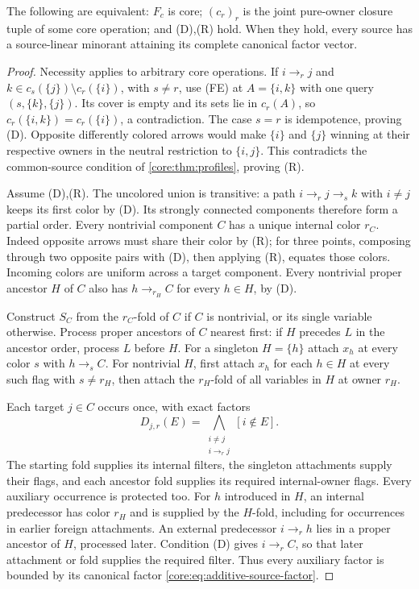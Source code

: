 \begin{theorem}
\label{core:thm:additive-closures}
The following are equivalent: $F_c$ is core; $(c_r)_r$ is the joint
pure-owner closure tuple of some core operation; and (D),(R) hold.
When they hold, every source has a source-linear minorant attaining
its complete canonical factor vector.
\end{theorem}
\begin{proof}
Necessity applies to arbitrary core operations. If $i\to_r j$ and
$k\in c_s(\{j\})\setminus c_r(\{i\})$, with $s\ne r$, use (FE)
at $A=\{i,k\}$ with one query $(s,\{k\},\{j\})$. Its cover is
empty and its sets lie in $c_r(A)$, so
$c_r(\{i,k\})=c_r(\{i\})$, a contradiction. The case $s=r$ is
idempotence, proving (D). Opposite differently colored arrows would
make $\{i\}$ and $\{j\}$ winning at their respective owners in the
neutral restriction to $\{i,j\}$. This contradicts the common-source
condition of \cref{core:thm:profiles}, proving (R).

Assume (D),(R). The uncolored union is transitive: a path
$i\to_r j\to_s k$ with $i\ne j$ keeps its first color by (D).
Its strongly connected components therefore form a partial order.
Every nontrivial component $C$ has a unique internal color $r_C$.
Indeed opposite arrows must share their color by (R); for three
points, composing through two opposite pairs with (D), then applying
(R), equates those colors. Incoming colors are uniform across a
target component. Every nontrivial proper ancestor $H$ of $C$ also
has $h\to_{r_H}C$ for every $h\in H$, by (D).

Construct $S_C$ from the $r_C$-fold of $C$ if $C$ is nontrivial,
or its single variable otherwise. Process proper ancestors of $C$
nearest first: if $H$ precedes $L$ in the ancestor order, process
$L$ before $H$. For a singleton $H=\{h\}$ attach $x_h$ at every
color $s$ with $h\to_s C$. For nontrivial $H$, first attach $x_h$
for each $h\in H$ at every such flag with $s\ne r_H$, then attach the $r_H$-fold of
all variables in $H$ at owner $r_H$.

Each target $j\in C$ occurs once, with exact factors
\begin{equation}\label{core:eq:additive-source-factor}
 D_{j,r}(E)=\bigwedge_{\substack{i\ne j\\i\to_r j}}[i\notin E].
\end{equation}
The starting fold supplies its internal filters, the singleton
attachments supply their flags, and each ancestor fold supplies its
required internal-owner flags. Every auxiliary occurrence is protected
too. For $h$ introduced in $H$, an internal predecessor has color
$r_H$ and is supplied by the $H$-fold, including for occurrences in
earlier foreign attachments. An external predecessor $i\to_r h$
lies in a proper ancestor of $H$, processed later. Condition (D)
gives $i\to_r C$, so that later attachment or fold supplies the
required filter. Thus every auxiliary factor is bounded by its
canonical factor \eqref{core:eq:additive-source-factor}.


\end{proof}
